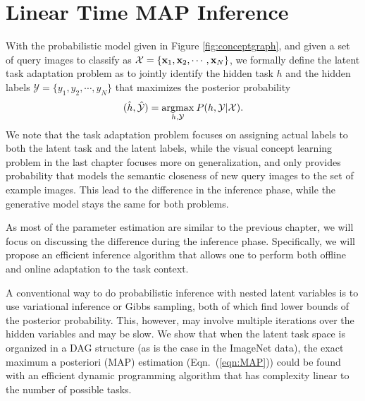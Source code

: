 \section{Linear Time MAP Inference}\label{sec:algo}
With the probabilistic model given in Figure \ref{fig:conceptgraph}, and given a set of query images to classify as $\mathcal{X} = \{\mathbf{x}_1, \mathbf{x}_2, \cdots, \mathbf{x}_N\}$, we formally define the latent task adaptation problem as to jointly identify the hidden task $h$ and the hidden labels $\mathcal{Y} = \{y_1, y_2, \cdots, y_N\}$ that maximizes the posterior probability
\begin{equation}\label{eqn:MAP}
    (\hat{h}, \hat{\mathcal{Y}}) = \underset{h, \mathcal{Y}}{\mathrm{argmax}} \: P(h, \mathcal{Y} | \mathcal{X}).
\end{equation}
We note that the task adaptation problem focuses on assigning actual labels to both the latent task and the latent labels, while the visual concept learning problem in the last chapter focuses more on generalization, and only provides probability that models the semantic closeness of new query images to the set of example images. This lead to the difference in the inference phase, while the generative model stays the same for both problems.

As most of the parameter estimation are similar to the previous chapter, we will focus on discussing the difference during the inference phase. Specifically, we will propose an efficient inference algorithm that allows one to perform both offline and online adaptation to the task context.

A conventional way to do probabilistic inference with nested latent variables is to use variational inference or Gibbs sampling, both of which find lower bounds of the posterior probability. This, however, may involve multiple iterations over the hidden variables and may be slow. We show that when the latent task space is organized in a DAG structure (as is the case in the ImageNet data), the exact maximum a posteriori (MAP) estimation (Eqn.\ (\ref{eqn:MAP})) could be found with an efficient dynamic programming algorithm that has complexity linear to the number of possible tasks.

